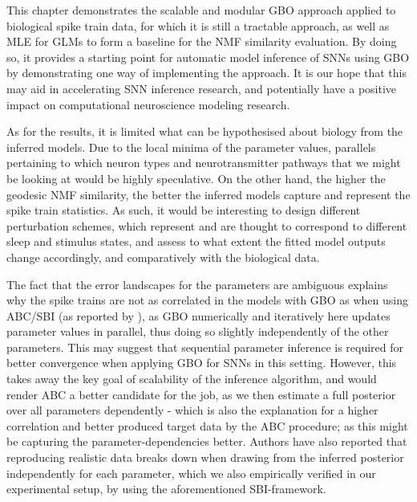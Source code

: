\documentclass[mphil,deptreport,ianc]{infthesis} %
\begin{document}

This chapter demonstrates the scalable and modular GBO approach applied to biological spike train data, for which it is still a tractable approach, as well as MLE for GLMs to form a baseline for the NMF similarity evaluation.
By doing so, it provides a starting point for automatic model inference of SNNs using GBO by demonstrating one way of implementing the approach.
It is our hope that this may aid in accelerating SNN inference research, and potentially have a positive impact on computational neuroscience modeling research.

As for the results, it is limited what can be hypothesised about biology from the inferred models.
Due to the local minima of the parameter values, parallels pertaining to which neuron types and neurotransmitter pathways that we might be looking at would be highly speculative.
On the other hand, the higher the geodesic NMF similarity, the better the inferred models capture and represent the spike train statistics.
As such, it would be interesting to design different perturbation schemes, which represent and are thought to correspond to different sleep and stimulus states, and assess to what extent the fitted model outputs change accordingly, and comparatively with the biological data.

The fact that the error landscapes for the parameters are ambiguous explains why the spike trains are not as correlated in the models with GBO as when using ABC/SBI (as reported by \cite{Rene2020}), as GBO numerically and iteratively here updates parameter values in parallel, thus doing so slightly independently of the other parameters. 
This may suggest that sequential parameter inference is required for better convergence when applying GBO for SNNs in this setting.
However, this takes away the key goal of scalability of the inference algorithm, and would render ABC a better candidate for the job, as we then estimate a full posterior over all parameters dependently - which is also the explanation for a higher correlation and better produced target data by the ABC procedure; as this might be capturing the parameter-dependencies better.
Authors have also reported that reproducing realistic data breaks down when drawing from the inferred posterior independently for each parameter, which we also empirically verified in our experimental setup, by using the aforementioned SBI-framework.
\end{document}
